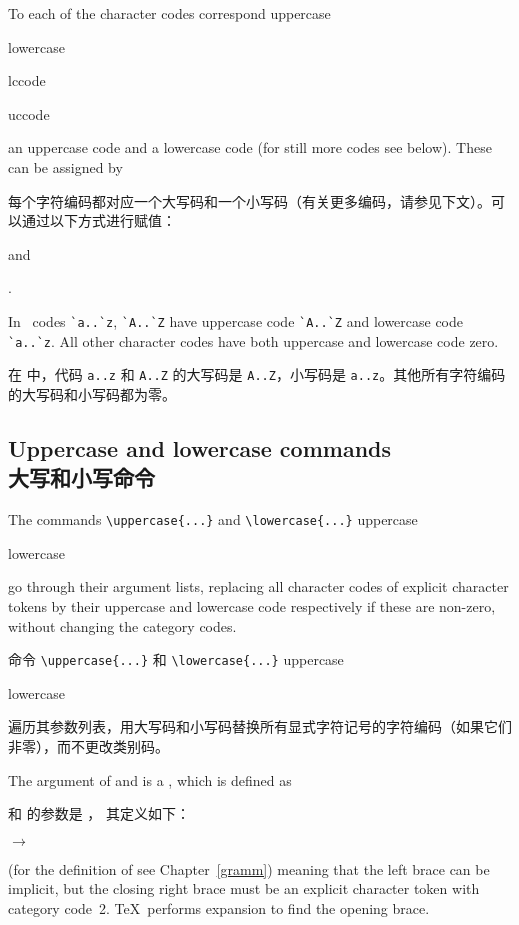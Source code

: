 To each of the character codes correspond
\term uppercase\par\term lowercase\par
\cstoidx lccode\par\cstoidx uccode\par
an uppercase code and a lowercase code (for still more codes see below).
These can be assigned
by 

每个字符编码都对应一个大写码和一个小写码（有关更多编码，请参见下文）。可以通过以下方式进行赋值：
\begin{Disp}\end{Disp}
and 
\begin{Disp}.\end{Disp}
In \IniTeX\ codes \verb-`a..`z-, \verb-`A..`Z- have uppercase code
\label{ini:uclc}
\verb-`A..`Z- and lowercase code \verb-`a..`z-.
All other character codes have both uppercase and lowercase
code zero.

在 \IniTeX 中，代码 \verb-a..z- 和 \verb-A..Z- 的大写码是
\label{ini:uclc}
\verb-A..Z-，小写码是 \verb-a..z-。其他所有字符编码的大写码和小写码都为零。


\subsection{Uppercase and lowercase commands\\大写和小写命令}
\label{upcase}

The commands \verb-\uppercase{...}- and \verb-\lowercase{...}-
\cstoidx uppercase\par\cstoidx lowercase\par
go through their argument lists, replacing all character 
codes of explicit character tokens
by their uppercase and lowercase code respectively
if these are non-zero,
without changing the category codes. 
\awp

命令 \verb-\uppercase{...}- 和 \verb-\lowercase{...}-
\cstoidx uppercase\par\cstoidx lowercase\par
遍历其参数列表，用大写码和小写码替换所有显式字符记号的字符编码（如果它们非零），而不更改类别码。


The argument of  and 
is a , which is defined as

 和  的参数是 ，
其定义如下：
\begin{Disp}  $\longrightarrow$ \lb
      \end{Disp}
(for the definition of  see Chapter~\ref{gramm})
meaning that the left brace can be implicit, but the closing
right brace must be an explicit character token with category
code~2. \TeX\ performs expansion to find the opening
brace.

